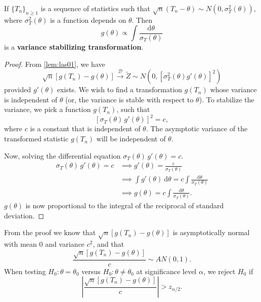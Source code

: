 \begin{theorem}
    If $\{T_n\}_{n \geq 1}$ is a sequence of statistics such that $\sqrt{n}(T_n - \theta) \sim N\left(0, \sigma^2_T(\theta) \right)$, 
    where $\sigma^2_T(\theta)$ is a function depends on $\theta$. Then 
    \begin{equation}
        g(\theta) \varpropto \int \frac{\mathrm{d}\theta}{\sigma_T(\theta)}
    \end{equation}
    is a \textbf{variance stabilizing transformation}.
\end{theorem}
\begin{proof}
    From \cref{lem:las01}, we have 
    \[
        \sqrt{n}\left[ g(T_n) - g(\theta)\right] \xrightarrow[]{\mathcal{D}} \widetilde{Z} \sim N\left(0, \left[\sigma^2_T(\theta) g'(\theta) \right]^2 \right)
    \]
    provided $g'(\theta)$ exists. We wish to find a transformation $g(T_n)$ whose variance is independent of $\theta$ (or, the variance is stable with respect to $\theta$). 
To stabilize the variance, we pick a function $g(T_n)$, such that 
\[
    [\sigma_T(\theta)\, g'(\theta)]^2 = c,
\]
where $c$ is a constant that is independent of $\theta$. The asymptotic variance of the transformed statistic $g(T_n)$ will be independent of $\theta$. 

Now, solving the differential equation $\sigma_T(\theta)\, g'(\theta) = c$.
\begin{align*}
    \sigma_T(\theta)\, g'(\theta) = c &\implies g'(\theta) = \frac{c}{\sigma_T(\theta)}\\
    &\implies \int g'(\theta) \> \mathrm{d}\theta = c \int \frac{\mathrm{d}\theta}{\sigma_T(\theta)}\\
    &\implies g(\theta) = c \int \frac{\mathrm{d}\theta}{\sigma_T(\theta)}.
\end{align*}
$g(\theta)$ is now proportional to the integral of the reciprocal of standard deviation.
\end{proof}

From the proof we know that $\sqrt{n}\left[ g(T_n) - g(\theta)\right]$ is asymptotically normal with mean $0$ and 
variance $c^2$, and that 
\begin{equation}
    \frac{\sqrt{n}\left[ g(T_n) - g(\theta)\right]}{c} \sim AN(0,1).
\end{equation}
When testing $H_0 : \theta = \theta_0$ versus $H_0 : \theta \neq \theta_0$ at significance
level $\alpha$, we reject $H_0$ if 
\begin{equation}
    \left| \frac{\sqrt{n}\left[ g(T_n) - g(\theta)\right]}{c} \right| > z_{\alpha/2}.
\end{equation}

